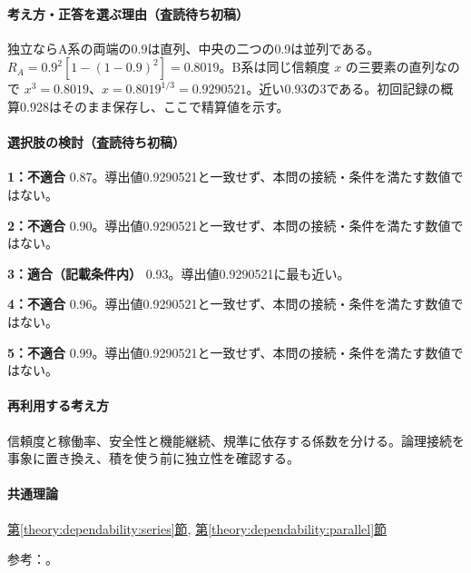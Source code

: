 \paragraph{考え方・正答を選ぶ理由（査読待ち初稿）} 独立ならA系の両端の0.9は直列、中央の二つの0.9は並列である。\(R_A=0.9^2[1-(1-0.9)^2]=0.8019\)。B系は同じ信頼度 \(x\) の三要素の直列なので \(x^3=0.8019\)、\(x=0.8019^{1/3}=0.9290521\)。近い0.93の3である。初回記録の概算0.928はそのまま保存し、ここで精算値を示す。

\paragraph{選択肢の検討（査読待ち初稿）}\mbox{}\par

\noindent\textbf{1：不適合} 0.87。導出値0.9290521と一致せず、本問の接続・条件を満たす数値ではない。\par

\noindent\textbf{2：不適合} 0.90。導出値0.9290521と一致せず、本問の接続・条件を満たす数値ではない。\par

\noindent\textbf{3：適合（記載条件内）} 0.93。導出値0.9290521に最も近い。\par

\noindent\textbf{4：不適合} 0.96。導出値0.9290521と一致せず、本問の接続・条件を満たす数値ではない。\par

\noindent\textbf{5：不適合} 0.99。導出値0.9290521と一致せず、本問の接続・条件を満たす数値ではない。\par

\paragraph{再利用する考え方} 信頼度と稼働率、安全性と機能継続、規準に依存する係数を分ける。論理接続を事象に置き換え、積を使う前に独立性を確認する。

\paragraph{共通理論} \hyperref[theory:dependability:series]{第\ref*{theory:dependability:series}節}, \hyperref[theory:dependability:parallel]{第\ref*{theory:dependability:parallel}節}

\par 参考：\cite{reliability_nist_series,reliability_nist_parallel}。

